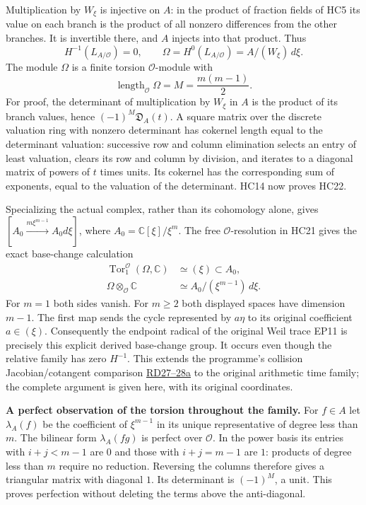 \documentclass[11pt,a4paper]{article}
\theoremstyle{definition}\newtheorem{definition}[theorem]{Definition}
\begin{document}
Multiplication by $W_\xi$ is injective on $A$: in the product of
fraction fields of HC5 its value on each branch is the product
of all nonzero differences from the other branches. It is invertible
there, and $A$ injects into that product. Thus
\[
 H^{-1}(L_{A/\mathcal O})=0,\qquad
 \Omega=H^0(L_{A/\mathcal O})=A/(W_\xi)\,d\xi.
 \tag{HC21}
\]
The module $\Omega$ is a finite torsion $\mathcal O$-module with
\[
 \operatorname{length}_{\mathcal O}\Omega=M=\frac{m(m-1)}2.
 \tag{HC22}
\]
For proof, the determinant of multiplication by $W_\xi$ in $A$
is the product of its branch values, hence
$(-1)^M\mathfrak D_A(t)$. A square matrix over the discrete
valuation ring with nonzero determinant has cokernel length equal
to the determinant valuation: successive row and column elimination
selects an entry of least valuation, clears its row and column by
division, and iterates to a diagonal matrix of powers of $t$ times
units. Its cokernel has the corresponding sum of exponents, equal
to the valuation of the determinant. HC14 now proves HC22.

Specializing the actual complex, rather than its cohomology alone,
gives $[A_0\xrightarrow{m\xi^{m-1}}A_0d\xi]$, where
$A_0=\mathbb C[\xi]/\xi^m$. The free $\mathcal O$-resolution
in HC21 gives the exact base-change calculation
\[
 \begin{split}
 \operatorname{Tor}_1^{\mathcal O}(\Omega,\mathbb C)
    &\simeq(\xi)\subset A_0,\\
 \Omega\otimes_{\mathcal O}\mathbb C
    &\simeq A_0/(\xi^{m-1})\,d\xi.
 \end{split}
 \tag{HC23}
\]
For $m=1$ both sides vanish. For $m\ge2$ both displayed spaces
have dimension $m-1$. The first map sends the cycle represented
by $a\eta$ to its original coefficient $a\in(\xi)$.
Consequently the endpoint radical of the original Weil trace
EP11 is precisely this explicit derived base-change group.
It occurs even though the relative family has zero $H^{-1}$.
This extends the programme's collision Jacobian/cotangent
comparison \href{https://github.com/KokunoYumeto/zeta-function-research-reader/blob/5a89872598df0902b7c1393cf8e4692ca3010a95/workbenches/splitzero-tandem/branches/tau-zero-prime-positivity/COLLISION_RESIDUE_DUALITY_DERIVATION.md}{RD27--28a}
to the original arithmetic time family;
the complete argument is given here, with its original coordinates.

\HC\textbf{A perfect observation of the torsion throughout the family.}
For $f\in A$ let $\lambda_A(f)$ be the coefficient of
$\xi^{m-1}$ in its unique representative of degree less than $m$.
The bilinear form $\lambda_A(fg)$ is perfect over $\mathcal O$.
In the power basis its entries with $i+j<m-1$ are $0$
and those with $i+j=m-1$ are $1$: products of degree less than
$m$ require no reduction. Reversing the columns therefore gives
a triangular matrix with diagonal $1$. Its determinant is
$(-1)^M$, a unit. This proves perfection without deleting the
terms above the anti-diagonal.
\end{document}
